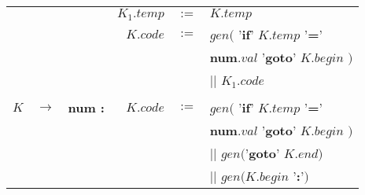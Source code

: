 \documentclass[class=article]{standalone}
\begin{document}
\begin{center}
\begin{tabular}{|rcl|rcl|}
          &               &                     & $K_1.temp$  & $:=$ & $K.temp$\\
          &               &                     & $K.code$    & $:=$ & $gen($ '{\bf if}' $K.temp$ '{\bf =}' \\
          &               &                     &             &      & {\bf num}$.val$ '{\bf goto}' $K.begin$ $)$\\
          &               &                     &             &      & || $K_1.code$\\
      &&&&&\\
      $K$ & $\rightarrow$ & {\bf num :} & $K.code$    & $:=$ & $gen($ '{\bf if}' $K.temp$ '{\bf =}' \\
          &               &             &             &      & {\bf num}$.val$ '{\bf goto}' $K.begin$ $)$\\
          &               &             &             &      & || $gen($'{\bf goto}' $K.end) $\\
          &               &             &             &      & || $gen(K.begin $ '{\bf :}'$)$\\
      \hline
  \end{tabular}
\end{center}
\end{document}
